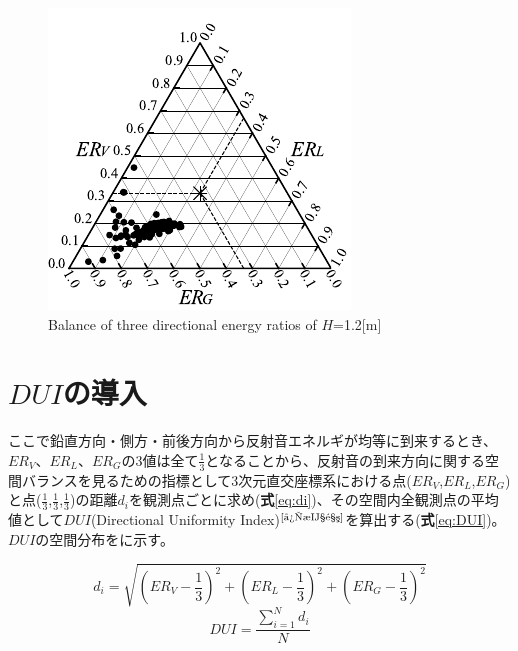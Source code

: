 \begin{figure}[htbp]
    \centering
    \includegraphics[keepaspectratio,scale=1.2]{05_att/rec_Ternary_out_1m.pdf}
    \caption{\hspace{1mm}Balance of three directional energy ratios of $H$=1.2[m]}
    \label{fig:sankaku1}
\end{figure}

\clearpage

\section{$DUI$の導入}
ここで鉛直方向・側方・前後方向から反射音エネルギが均等に到来するとき、$ER_V$、$ER_L$、$ER_G$の3値は全て$\frac{1}{3}$となることから、反射音の到来方向に関する空間バランスを見るための指標として3次元直交座標系における点($ER_V$,$ER_L$,$ER_G$)と点($\frac{1}{3}$,$\frac{1}{3}$,$\frac{1}{3}$)の距離$d_i$を観測点ごとに求め(\textbf{式}\ref{eq:di})、その空間内全観測点の平均値として$DUI$(Directional Uniformity Index)$^{\text{\cite{後期音}}}$を算出する(\textbf{式}\ref{eq:DUI})。$DUI$の空間分布をに示す。

\begin{table}[htbp]
\begin{equation}
  \label{eq:di}
  d_i = \sqrt{\left({ER_V-\frac{1}{3}}\right)^2 + \left(ER_L-\frac{1}{3}\right)^2 + \left(ER_G-\frac{1}{3}\right)^2} 
\end{equation}
\begin{equation}
    \label{eq:DUI}
    DUI=\frac{\sum_{i=1}^N{d_i}}{N}
\end{equation}
\end{table}

